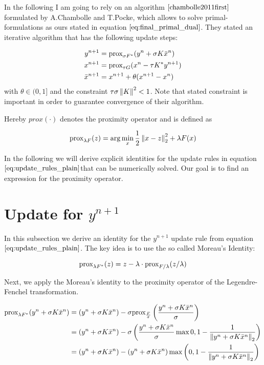 In the following I am going to rely on an algorithm $\cite{chambolle2011first}$ formulated by A.Chambolle and T.Pocke, which allows to solve primal-formulations as ours stated in equation $\ref{eq:final_primal_dual}$.
They stated an iterative algorithm that has the following update steps:

\begin{align}
	y^{n+1} &= \text{prox}_{\sigma F^*}(y^n + \sigma K \bar{x}^n) \nonumber \\
	x^{n+1} &= \text{prox}_{\tau G}(x^n - \tau K^* y^{n+1}) \\
	\bar{x}^{n+1} &= x^{n+1} + \theta(x^{n+1} - x^n)
\label{eq:update_rules_plain}	
\end{align}
with $\theta \in (0, 1]$ and the constraint $\tau \sigma \left\lVert K\right\rVert^2 < 1$. Note that stated constraint is important in order to guarantee convergence of their algorithm.

Hereby $prox(\cdot)$ denotes the proximity operator and is defined as 

\begin{equation}
	\text{prox}_{\lambda F}(z) = \arg \min_x \frac{1}{2} \left\lVert x - z\right\rVert_2^2 + \lambda F(x)
\end{equation}

In the following we will derive explicit identities for the update rules in equation $\ref{eq:update_rules_plain}$that can be numerically solved. Our goal is to find an expression for the proximity operator.

\section{Update for $y^{n+1}$}

In this subsection we derive an identity for the $y^{n+1}$ update rule from equation $\ref{eq:update_rules_plain}$. The key idea is to use the so called Moreau's Identity:  

\begin{equation}
	\text{prox}_{\lambda F^*}(z) = z - \lambda \cdot \text{prox}_{F/ \lambda}(z / \lambda) 
\label{eq:moreau}	
\end{equation}

Next, we apply the Moreau's identity to the proximity operator of the Legendre-Fenchel transformation.


\begin{align}
	\text{prox}_{\lambda F^*}(y^n + \sigma K \bar{x}^{n}) 
	&= (y^n + \sigma K \bar{x}^{n}) - \sigma \text{prox}_{\frac{F}{\sigma} } \left(\frac{y^n + \sigma K \bar{x}^{n} }{\sigma} \right) \nonumber \\
	&= (y^n + \sigma K \bar{x}^{n}) - \sigma \left( \frac{y^n + \sigma K \bar{x}^{n} }{\sigma} \max{0, 1-\frac{1}{\left\lVert y^n + \sigma K \bar{x}^{n} \right\rVert_2}} \right) \nonumber \\
	&= (y^n + \sigma K \bar{x}^{n}) - \left( y^n + \sigma K \bar{x}^{n} \right) \max{\left(0, 1-\frac{1}{\left\lVert y^n + \sigma K \bar{x}^{n} \right\rVert_2}\right)}  
\label{eq:y_n_1_expression}
\end{align}

